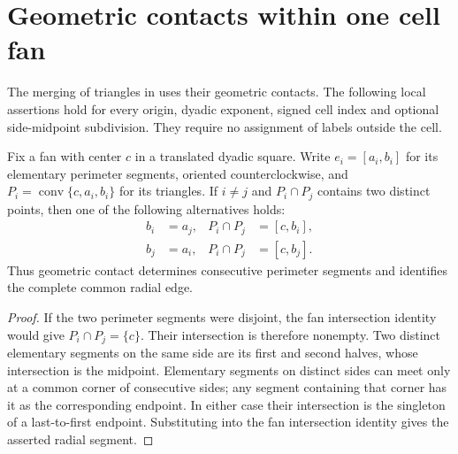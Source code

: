 \section{Geometric contacts within one cell fan}
\label{sec:area_law_fan_run_contacts}

The merging of triangles in \cite[Section~11]{OpenAI2026AreaLaw} uses their
geometric contacts. The following local assertions hold for every origin,
dyadic exponent, signed cell index and optional side-midpoint subdivision.
They require no assignment of labels outside the cell.


\begin{lemma}
    \label{thm:area_law_fan_triangle_contact}
    \leanok
    Fix a fan with center $c$ in a translated dyadic square. Write
    $e_i=[a_i,b_i]$ for its elementary perimeter segments, oriented
    counterclockwise, and $P_i=\operatorname{conv}\{c,a_i,b_i\}$ for its
    triangles. If $i\ne j$ and $P_i\cap P_j$ contains two distinct points,
    then one of the following alternatives holds:
    \begin{align}
        b_i & =a_j, & P_i\cap P_j & =[c,b_i], \\
        b_j & =a_i, & P_i\cap P_j & =[c,b_j].
    \end{align}
    Thus geometric contact determines consecutive perimeter segments and
    identifies the complete common radial edge.
\end{lemma}
\begin{proof}\leanok
    If the two perimeter segments were disjoint, the fan intersection
    identity would give $P_i\cap P_j=\{c\}$. Their intersection is therefore
    nonempty. Two distinct elementary segments on the same side are its
    first and second halves, whose intersection is the midpoint. Elementary
    segments on distinct sides can meet only at a common corner of
    consecutive sides; any segment containing that corner has it as the
    corresponding endpoint. In either case their intersection is the
    singleton of a last-to-first endpoint. Substituting into the fan
    intersection identity gives the asserted radial segment.
\end{proof}

